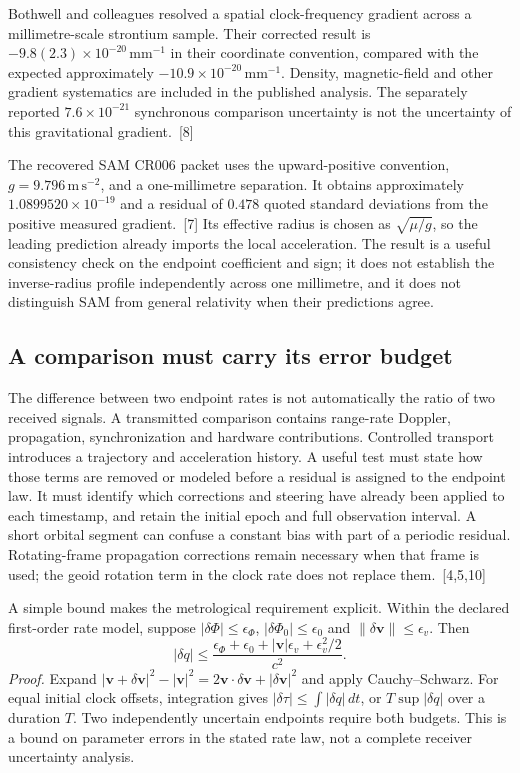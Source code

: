 \documentclass[10pt,twocolumn,letterpaper]{article}
\begin{document}
Bothwell and colleagues resolved a spatial clock-frequency gradient across a millimetre-scale strontium sample. Their corrected result is $-9.8(2.3)\times 10^{-20}\,\mathrm{mm}^{-1}$ in their coordinate convention, compared with the expected approximately $-10.9\times 10^{-20}\,\mathrm{mm}^{-1}$. Density, magnetic-field and other gradient systematics are included in the published analysis. The separately reported $7.6\times 10^{-21}$ synchronous comparison uncertainty is not the uncertainty of this gravitational gradient.~[8]

The recovered SAM CR006 packet uses the upward-positive convention, $g=9.796\,\mathrm{m\,s^{-2}}$, and a one-millimetre separation. It obtains approximately $1.0899520\times 10^{-19}$ and a residual of $0.478$ quoted standard deviations from the positive measured gradient.~[7] Its effective radius is chosen as $\sqrt{\mu/g}$, so the leading prediction already imports the local acceleration. The result is a useful consistency check on the endpoint coefficient and sign; it does not establish the inverse-radius profile independently across one millimetre, and it does not distinguish SAM from general relativity when their predictions agree.


\label{app:errors}


\subsection{A comparison must carry its error budget}
The difference between two endpoint rates is not automatically the ratio of two received signals. A transmitted comparison contains range-rate Doppler, propagation, synchronization and hardware contributions. Controlled transport introduces a trajectory and acceleration history. A useful test must state how those terms are removed or modeled before a residual is assigned to the endpoint law. It must identify which corrections and steering have already been applied to each timestamp, and retain the initial epoch and full observation interval. A short orbital segment can confuse a constant bias with part of a periodic residual. Rotating-frame propagation corrections remain necessary when that frame is used; the geoid rotation term in the clock rate does not replace them.~[4,5,10]

A simple bound makes the metrological requirement explicit. Within the declared first-order rate model, suppose $|\delta\Phi|\le\epsilon_\Phi$, $|\delta\Phi_0|\le\epsilon_0$ and $\|\delta\mathbf v\|\le\epsilon_v$. Then
\[
 |\delta q|\le
 \frac{\epsilon_\Phi+\epsilon_0+|\mathbf v|\epsilon_v+\epsilon_v^2/2}{c^2}.
\]
\textit{Proof.} Expand $|\mathbf v+\delta\mathbf v|^2-|\mathbf v|^2=2\mathbf v\cdot\delta\mathbf v+|\delta\mathbf v|^2$ and apply Cauchy--Schwarz. For equal initial clock offsets, integration gives $|\delta\tau|\le\int|\delta q|\,dt$, or $T\sup|\delta q|$ over a duration $T$. Two independently uncertain endpoints require both budgets. This is a bound on parameter errors in the stated rate law, not a complete receiver uncertainty analysis.
\end{document}

